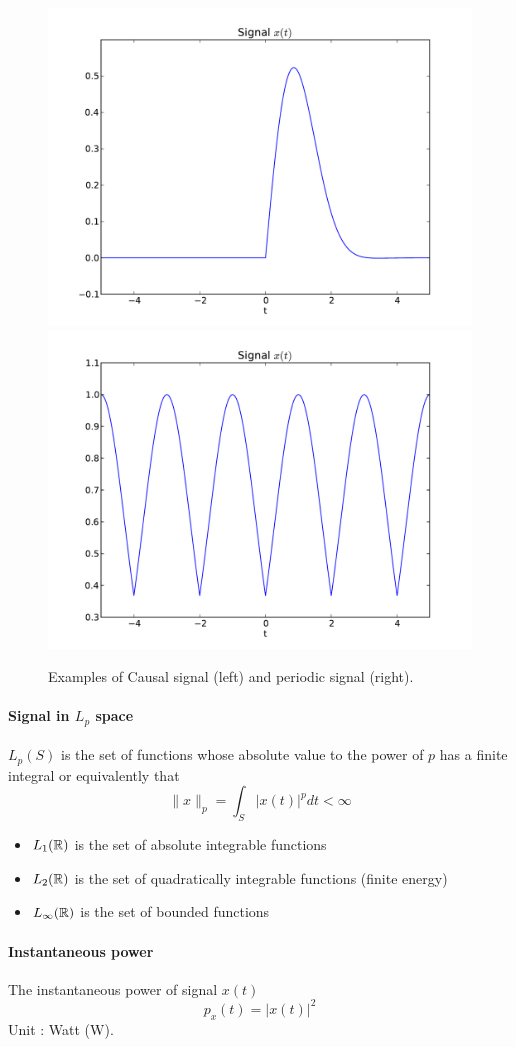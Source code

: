 \begin{figure}[t]
    \centering
    \includegraphics[width=.45\linewidth]{imgs/sig_conv/sig_causal.pdf}
    \includegraphics[width=.45\linewidth]{imgs/sig_conv/sig_per.pdf}
    \caption{Examples of Causal signal (left) and periodic signal (right).}
    \label{fig:ex_causal_per}
\end{figure}



\paragraph{Signal in $L_p$ space}
$L_p(S)$ is the set of functions whose absolute value to the power of $p$
has a finite integral or equivalently that
\begin{equation}
  \|x\|_p=\int_S |x(t)|^p dt < \infty
  \label{eq:lp_space}
\end{equation}
\begin{itemize}
  \item $L_1(\mathbb{R})$ is the set of absolute integrable functions
  \item $L_2(\mathbb{R})$ is the set of quadratically integrable functions (finite energy)
  \item $L_\infty(\mathbb{R})$ is the set of bounded functions
\end{itemize}

\paragraph{Instantaneous power}
The instantaneous power of signal $x(t)$ 
\begin{equation}
  \label{eq:puissinst}
  p_x(t)=|x(t)|^2
\end{equation}
 Unit :  Watt (W).


